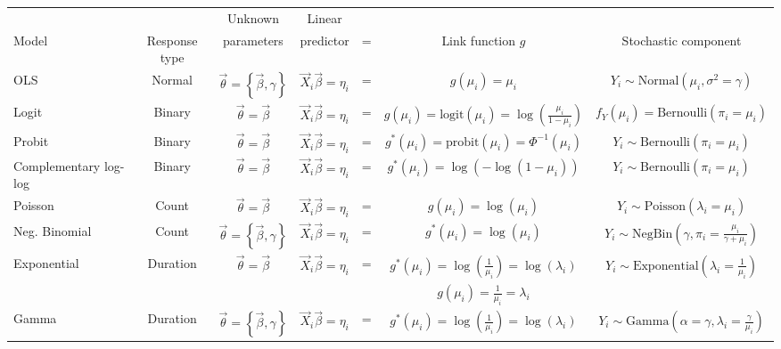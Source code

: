\documentclass[11pt]{article}
\newcommand{\logit}{\text{logit}}
\begin{document}
\begin{sidewaystable}[!htbp]
\small
\centering
\begin{tabular}{lcccccc}
 & & Unknown & Linear \\
Model & Response type & parameters & predictor & = & Link function $g$ & Stochastic component \\
\hline

OLS & 
	Normal & 
	$\vec\theta=\left\{\vec\beta,\gamma\right\}$ & 
	$\vec{X}_i\vec\beta=\eta_i$ & 
	= &
	$g(\mu_i) = \mu_i$ & 
	$Y_i \sim \text{Normal}(\mu_i,\sigma^2 = \gamma)$ \\

Logit & 
	Binary & 
	$\vec\theta=\vec\beta$ & 
	$\vec{X}_i\vec\beta=\eta_i$ & 
	= &
	$g(\mu_i) = \logit(\mu_i) = \log\left(\frac{\mu_i}{1-\mu_i}\right)$ & 
	$f_Y(\mu_i) = \text{Bernoulli}(\pi_i = \mu_i)$ \\

Probit & 
	Binary & 
	$\vec\theta=\vec\beta$ & 
	$\vec{X}_i\vec\beta=\eta_i$ & 
	= &
	$g^*(\mu_i) = \text{probit}(\mu_i) = \Phi^{-1}(\mu_i)$ & 
	$Y_i \sim \text{Bernoulli}(\pi_i = \mu_i)$ \\
	
Complementary log-log & 
	Binary & 
	$\vec\theta=\vec\beta$ & 
	$\vec{X}_i\vec\beta=\eta_i$ & 
	= &
	$g^*(\mu_i) = \log(-\log(1-\mu_i)) $ & 
	$Y_i \sim \text{Bernoulli}(\pi_i = \mu_i)$ \\
	
Poisson & 
	Count & 
	$\vec\theta=\vec\beta$ & 
	$\vec{X}_i\vec\beta=\eta_i$ & 
	= &
	$g(\mu_i) = \log(\mu_i)$ & 
	$Y_i \sim \text{Poisson}(\lambda_i = \mu_i)$ \\

Neg. Binomial & 
	Count & $\vec\theta=\left\{\vec\beta,\gamma\right\}$ & 
	$\vec{X}_i\vec\beta=\eta_i$ & 
	= &
	$g^*(\mu_i) = \log(\mu_i)$ & 
	$Y_i \sim \text{NegBin}\left(\gamma, \pi_i = \frac{\mu_i}{\gamma + \mu_i}\right)$ \\

Exponential & 
	Duration & 
	$\vec\theta=\vec\beta$ & 
	$\vec{X}_i\vec\beta=\eta_i$ & 
	= &
	$g^*(\mu_i) = \log\left(\frac{1}{\mu_i}\right) = \log\left(\lambda_i\right)$ & 
	$Y_i \sim \text{Exponential}\left(\lambda_i = \frac{1}{\mu_i}\right)$ \\
	
	& & & & & $g(\mu_i) = \frac{1}{\mu_i} = \lambda_i$ \\


Gamma & 
	Duration & 
	$\vec\theta=\left\{\vec\beta,\gamma\right\}$ & 
	$\vec{X}_i\vec\beta=\eta_i$ & 
	= &
	$g^*(\mu_i) = \log\left(\frac{1}{\mu_i}\right) = \log\left(\lambda_i\right)$ & 
	$Y_i \sim \text{Gamma}\left(\alpha = \gamma, \lambda_i = \frac{\gamma}{\mu_i}\right)$ \\
	

\end{tabular}
\end{sidewaystable}
\end{document}
